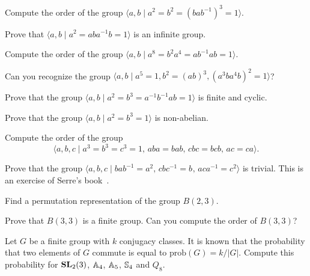 \begin{prob}
  Compute the order of the group $\langle a,b\mid a^2=b^2=(bab^{-1})^3=1\rangle$. 
\end{prob}

\begin{prob}
  Prove that $\langle a,b\mid a^2=aba^{-1}b=1\rangle$ is an infinite group.
\end{prob}

\begin{prob}
	\label{prob:order16}
  Compute the order of the group
  $\langle a,b\mid  a^8=b^2a^4=ab^{-1}ab=1\rangle$.
\end{prob}

\begin{prob}
\label{prob:recognizeA5}
Can you recognize the group $\langle a,b\mid a^5=1, b^2=(ab)^3, (a^3ba^4b)^2=1\rangle$?
\end{prob}
%
\begin{prob}
Prove that the group $\langle a,b\mid a^2=b^3=a^{-1}b^{-1}ab=1\rangle$ is finite and cyclic.
\end{prob}

\begin{prob}
Prove that the group $\langle a,b\mid a^2=b^3=1\rangle$ is non-abelian.
\end{prob}

\begin{prob}
\label{prob:order=648}
Compute the order of the group
\[
  \langle a,b,c\mid a^3=b^3=c^3=1,\,aba=bab,\,cbc=bcb,\,ac=ca\rangle.
\]
\end{prob}

\begin{prob}
	\label{prob:Serre}
	Prove that the group $\langle a,b,c\mid bab^{-1}=a^{2},\,cbc^{-1}=b^{},\,
	aca^{-1}=c^{2}\rangle$ is trivial. This is an exercise of Serre's
	book~\cite[\S1]{MR1954121}.
\end{prob}

\begin{prob}
	\label{prob:B23perm}
	Find a permutation representation of the group $B(2,3)$.
\end{prob}

\begin{prob}
	\label{prob:B33}
	Prove that 
	$B(3,3)$ %
	is a finite group. Can you compute the
	order of $B(3,3)$?
\end{prob}

\begin{prob}
	\label{prob:probability}
	Let $G$ be a finite group with $k$ conjugacy classes.  It is known that the
	probability that two elements of $G$ commute is equal to
	$\mathrm{prob}(G)=k/|G|$. Compute this probability for $\mathbf{SL}_2(3)$,
	$\mathbb{A}_4$, $\mathbb{A}_5$, $\mathbb{S}_4$ and $Q_8$.
\end{prob}



